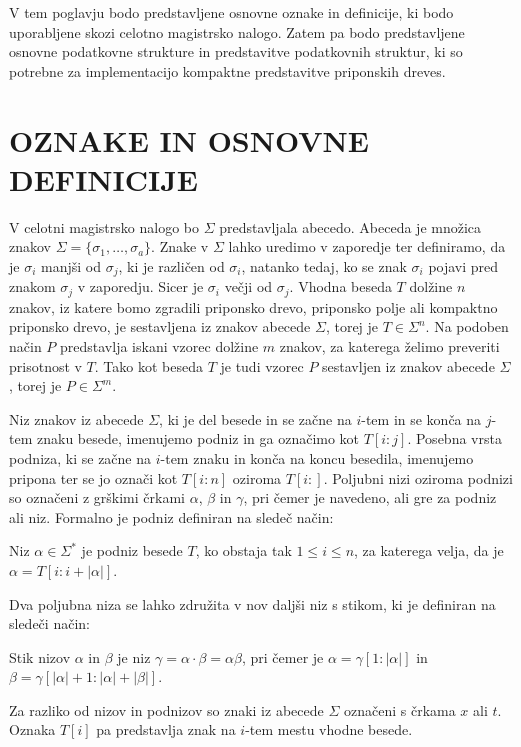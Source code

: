 
V tem poglavju bodo predstavljene osnovne oznake in definicije, ki bodo uporabljene skozi celotno magistrsko nalogo. Zatem pa bodo predstavljene osnovne podatkovne strukture in predstavitve podatkovnih struktur, ki so potrebne za implementacijo kompaktne predstavitve priponskih dreves.


\section{OZNAKE IN OSNOVNE DEFINICIJE}\label{sec:def}
V celotni magistrsko nalogo bo $\Sigma$ predstavljala abecedo. Abeceda je množica znakov $\Sigma=\{\sigma_1,\dots,\sigma_a\}$. Znake v $\Sigma$ lahko uredimo v zaporedje ter definiramo, da je $\sigma_i$ manjši od $\sigma_j$, ki je različen od $\sigma_i$, natanko tedaj, ko se znak $\sigma_i$ pojavi pred znakom $\sigma_j$ v zaporedju. Sicer je $\sigma_i$ večji od $\sigma_j$.
Vhodna beseda $T$ dolžine $n$ znakov, iz katere bomo zgradili priponsko drevo, priponsko polje ali kompaktno priponsko drevo, je sestavljena iz znakov abecede $\Sigma$, torej je $T\in\Sigma^n$. Na podoben način $P$ predstavlja iskani vzorec dolžine $m$ znakov, za katerega želimo preveriti prisotnost v $T$. Tako kot beseda $T$ je tudi vzorec $P$ sestavljen iz znakov abecede $\Sigma$, torej je $P\in\Sigma^m$.

Niz znakov iz abecede $\Sigma$, ki je del besede in se začne na $i$-tem in se konča na $j$-tem znaku besede, imenujemo podniz in ga označimo kot $T[i:j]$. Posebna vrsta podniza, ki se začne na $i$-tem znaku in konča na koncu besedila, imenujemo pripona ter se jo označi kot $T[i:n]$ oziroma $T[i:]$. Poljubni nizi oziroma podnizi so označeni z grškimi črkami $\alpha$, $\beta$ in $\gamma$, pri čemer je navedeno, ali gre za podniz ali niz. Formalno je podniz definiran na sledeč način:
\begin{defi}
    Niz $\alpha\in\Sigma^*$ je podniz besede $T$, ko obstaja tak $1\le i\le n$, za katerega velja, da je  $\alpha=T[i:i+|\alpha|]$. 
\end{defi}
Dva poljubna niza se lahko združita v nov daljši niz s stikom, ki je definiran na sledeči način:
\begin{defi}
    Stik nizov $\alpha$ in $\beta$ je niz $\gamma=\alpha\cdot\beta=\alpha\beta$, pri čemer je $\alpha=\gamma[1:|\alpha|]$ in $\beta=\gamma[|\alpha|+1:|\alpha|+|\beta|]$.
\end{defi}

Za razliko od nizov in podnizov so znaki iz abecede $\Sigma$ označeni s črkama $x$ ali $t$. Oznaka $T[i]$ pa predstavlja znak na $i$-tem mestu vhodne besede.

